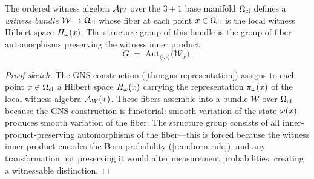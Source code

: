 \begin{theorem}
\label{thm:witness-bundle}
The ordered witness algebra $\mathcal{A}_W$ over the $3+1$ base manifold
$\Omega_{\mathrm{cl}}$ defines a \emph{witness bundle} $\mathcal{W} \to \Omega_{\mathrm{cl}}$
whose fiber at each point $x \in \Omega_{\mathrm{cl}}$ is the local witness Hilbert
space $H_\omega(x)$.  The structure group of this bundle is the group of
fiber automorphisms preserving the witness inner product:
\[
  G \;=\; \mathrm{Aut}_{\langle\cdot,\cdot\rangle}\!\bigl(\mathcal{W}_x\bigr).
\]
\begin{proof}[Proof sketch]
The GNS construction (\cref{thm:gns-representation}) assigns to each point
$x \in \Omega_{\mathrm{cl}}$ a Hilbert space $H_\omega(x)$ carrying the representation
$\pi_\omega(x)$ of the local witness algebra $\mathcal{A}_W(x)$.  These fibers
assemble into a bundle $\mathcal{W}$ over $\Omega_{\mathrm{cl}}$ because the GNS
construction is functorial: smooth variation of the state $\omega(x)$
produces smooth variation of the fiber.  The structure group consists of all
inner-product-preserving automorphisms of the fiber---this is forced because
the witness inner product encodes the Born probability (\cref{rem:born-rule}),
and any transformation not preserving it would alter measurement probabilities,
creating a witnessable distinction.

\end{proof}
\end{theorem}

